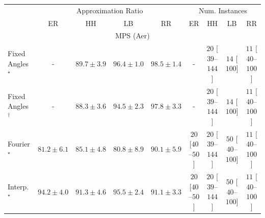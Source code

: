 \begin{tabular}{l|cccc|cccc|}
\toprule
& \multicolumn{4}{c|}{Approximation Ratio} & \multicolumn{4}{c|}{Num. Instances} \\
            & ER & HH & LB & RR & ER & HH & LB & RR \\
\midrule
\multicolumn{9}{c}{\rule{0pt}{8pt}MPS (Aer)} \\
\midrule
Fixed Angles$^\star$ & {\cellcolor[HTML]{000000}} \color[HTML]{F1F1F1} {\cellcolor{white}} \color{black} - & {\cellcolor[HTML]{8A59A8}} \color[HTML]{F1F1F1} $89.7\pm 3.9$ & {\cellcolor[HTML]{6F0A6B}} \color[HTML]{F1F1F1} $96.4\pm 1.0$ & {\cellcolor[HTML]{4F004D}} \color[HTML]{F1F1F1} $98.5\pm 1.4$ & {\cellcolor[HTML]{000000}} \color[HTML]{F1F1F1} {\cellcolor{white}} \color{black} - & {\cellcolor[HTML]{FDE4E1}} \color[HTML]{000000} $20$ [$39$--$144$] & {\cellcolor[HTML]{FEEAE7}} \color[HTML]{000000} $14$ [$100$] & {\cellcolor[HTML]{FEEEEA}} \color[HTML]{000000} $11$ [$40$--$100$] \\
Fixed Angles$^\dagger$ & {\cellcolor[HTML]{000000}} \color[HTML]{F1F1F1} {\cellcolor{white}} \color{black} - & {\cellcolor[HTML]{8C6AB1}} \color[HTML]{F1F1F1} $88.3\pm 3.6$ & {\cellcolor[HTML]{821982}} \color[HTML]{F1F1F1} $94.5\pm 2.3$ & {\cellcolor[HTML]{5A0457}} \color[HTML]{F1F1F1} $97.8\pm 3.3$ & {\cellcolor[HTML]{000000}} \color[HTML]{F1F1F1} {\cellcolor{white}} \color{black} - & {\cellcolor[HTML]{FDE4E1}} \color[HTML]{000000} $20$ [$39$--$144$] & {\cellcolor[HTML]{FEEAE7}} \color[HTML]{000000} $14$ [$100$] & {\cellcolor[HTML]{FEEEEA}} \color[HTML]{000000} $11$ [$40$--$100$] \\
Fourier$^\star$ & {\cellcolor[HTML]{9FBCDA}} \color[HTML]{000000} $81.2\pm 6.1$ & {\cellcolor[HTML]{8C91C4}} \color[HTML]{F1F1F1} $85.1\pm 4.8$ & {\cellcolor[HTML]{A3BFDC}} \color[HTML]{000000} $80.8\pm 8.9$ & {\cellcolor[HTML]{8A54A6}} \color[HTML]{F1F1F1} $90.1\pm 5.9$ & {\cellcolor[HTML]{FDE4E1}} \color[HTML]{000000} $20$ [$40$--$50$] & {\cellcolor[HTML]{FDE4E1}} \color[HTML]{000000} $20$ [$39$--$144$] & {\cellcolor[HTML]{FCC0BF}} \color[HTML]{000000} $50$ [$40$--$100$] & {\cellcolor[HTML]{FEEEEA}} \color[HTML]{000000} $11$ [$40$--$100$] \\
Interp.$^\star$ & {\cellcolor[HTML]{831D85}} \color[HTML]{F1F1F1} $94.2\pm 4.0$ & {\cellcolor[HTML]{88459F}} \color[HTML]{F1F1F1} $91.3\pm 4.6$ & {\cellcolor[HTML]{7C0E78}} \color[HTML]{F1F1F1} $95.5\pm 2.4$ & {\cellcolor[HTML]{8948A0}} \color[HTML]{F1F1F1} $91.1\pm 3.3$ & {\cellcolor[HTML]{FDE4E1}} \color[HTML]{000000} $20$ [$40$--$50$] & {\cellcolor[HTML]{FDE4E1}} \color[HTML]{000000} $20$ [$39$--$144$] & {\cellcolor[HTML]{FCC0BF}} \color[HTML]{000000} $50$ [$40$--$100$] & {\cellcolor[HTML]{FEEEEA}} \color[HTML]{000000} $11$ [$40$--$100$] \\

\end{tabular}
